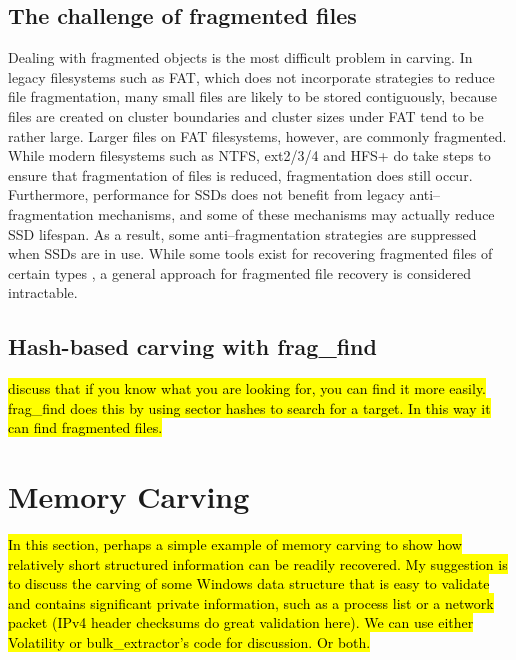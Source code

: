 \subsection{The challenge of fragmented files}

Dealing with fragmented objects is the most difficult problem in
carving.  In legacy filesystems such as FAT, which does not
incorporate strategies to reduce file fragmentation, many small files
are likely to be stored contiguously, because files are created on
cluster boundaries and cluster sizes under FAT tend to be rather
large.  Larger files on FAT filesystems, however, are commonly
fragmented\cite{dfrws2007:SimsonLGarfinkel}.  While modern filesystems
such as NTFS, ext2/3/4 and HFS+ do take steps to ensure that
fragmentation of files is reduced, fragmentation does still occur.
Furthermore, performance for SSDs does not benefit from legacy
anti--fragmentation mechanisms, and some of these mechanisms may
actually reduce SSD lifespan.  As a result, some anti--fragmentation
strategies are suppressed when SSDs are in use.  While some tools
exist for recovering fragmented files of certain types \cite{adroit},
a general approach for fragmented file recovery is considered intractable.

\subsection{Hash-based carving with frag\_find}

\hl{discuss that if you know what you are looking for, you can find it
  more easily. frag\_find does this by using sector hashes to search
  for a target. In this way it can find fragmented files.}


\section{Memory Carving}

\hl{In this section, perhaps a simple example of memory carving to
  show how relatively short structured information can be readily
  recovered. My suggestion is to discuss the carving of some Windows
  data structure that is easy to validate and contains significant
  private information, such as a process list or a network packet
  (IPv4 header checksums do great validation here). We can use either
  Volatility or bulk\_extractor's code for discussion. Or both. }

